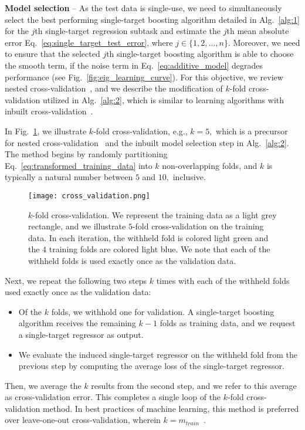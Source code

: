 \documentclass[aps,twocolumn,superscriptaddress,floatfix,preprintnumbers,showkeys]{revtex4}
\begin{document}
\textbf{Model selection} -- As the test data is single-use, we need to simultaneously select the best performing single-target boosting algorithm detailed in Alg.~\ref{alg:1} for the $j$th single-target regression subtask and estimate the $j$th mean absolute error Eq.~\ref{eq:single_target_test_error}, where $j \in \{ 1,2,\dots,n \}.$ Moreover, we need to ensure that the selected $j$th single-target boosting algorithm is able to choose the smooth term, if the noise term in Eq.~\ref{eq:additive_model} degrades performance (see Fig.\ \ref{fig:eig_learning_curve}). For this objective, we review nested cross-validation~\cite{Hastie_2009, Cawley_2010, Sklearn_2011}, and we describe the modification of $k$-fold cross-validation utilized in Alg.~\ref{alg:2}, which is similar to learning algorithms with inbuilt cross-validation~\cite{Sklearn_2011}. 

In Fig.~\ref{fig:cross_validation}, we illustrate $k$-fold cross-validation, e.g., $k=5,$ which is a precursor for nested cross-validation~\cite{Hastie_2009, Cawley_2010, Sklearn_2011} and the inbuilt model selection step in Alg.~\ref{alg:2}. The method begins by randomly partitioning Eq.~\ref{eq:transformed_training_data} into $k$ non-overlapping folds, and $k$ is typically a natural number between $5$ and $10,$ inclusive.
\begin{figure}
\centering
\texttt{[image: cross\_validation.png]}
\caption{$k$-fold cross-validation. We represent the training data as a light grey rectangle, and we illustrate $5$-fold cross-validation on the training data. In each iteration, the withheld fold is colored light green and the $4$ training folds are colored light blue. We note that each of the withheld folds is used exactly once as the validation data.}
\label{fig:cross_validation}
\end{figure}
Next, we repeat the following two steps $k$ times with each of the withheld folds used exactly once as the validation data:\
\begin{itemize}
\item Of the $k$ folds, we withhold one for validation. A single-target boosting algorithm receives the remaining $k-1$ folds as training data, and we request a single-target regressor as output.
\item We evaluate the induced single-target regressor on the withheld fold from the previous step by computing the average loss of the single-target regressor.
\end{itemize}
Then, we average the $k$ results from the second step, and we refer to this average as cross-validation error. This completes a single loop of the $k$-fold cross-validation method. In best practices of machine learning, this method is preferred over leave-one-out cross-validation, wherein $k=m_{train}$~\cite{Hastie_2009, Cawley_2010, Sklearn_2011}.
\end{document}
